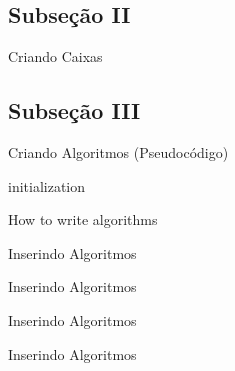 \documentclass{ufc_format}
\begin{document}
\subsection{Subseção II}
\begin{frame}{Criando Caixas}

    \pause


    \pause

\end{frame}

\subsection{Subseção III}
\begin{frame}{Criando Algoritmos (Pseudocódigo)}
    \begin{algorithm}[H]
        \SetAlgoLined
        \LinesNumbered
         initialization\;
         \caption{How to write algorithms}
    \end{algorithm}
\end{frame}

    

\begin{frame}{Inserindo Algoritmos}
    \lstset{language=Python}
    
\end{frame}

\begin{frame}{Inserindo Algoritmos}
    
\end{frame}

\begin{frame}{Inserindo Algoritmos}
    
\end{frame}

\begin{frame}{Inserindo Algoritmos}
    
\end{frame}
\end{document}
